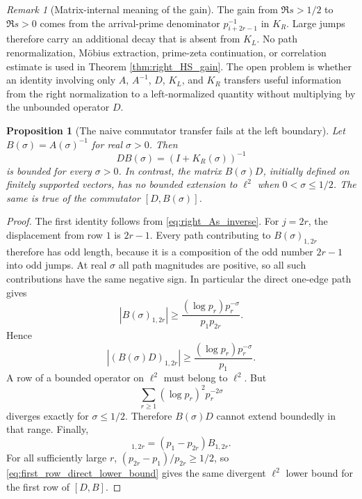 \documentclass[11pt]{amsart}
\numberwithin{equation}{section}
\theoremstyle{plain}
\newtheorem{proposition}[theorem]{Proposition}
\theoremstyle{definition}
\theoremstyle{remark}
\newtheorem{remark}[theorem]{Remark}
\begin{document}
\begin{remark}[Matrix-internal meaning of the gain]
\label{rem:right_gain_meaning}
The gain from $\Re s>1/2$ to $\Re s>0$ comes from the arrival-prime denominator $p_{i+2r-1}^{-1}$ in $K_R$.  Large jumps therefore carry an additional decay that is absent from $K_L$.  No path renormalization, M\"obius extraction, prime-zeta continuation, or correlation estimate is used in Theorem \ref{thm:right_HS_gain}.  The open problem is whether an identity involving only $A$, $A^{-1}$, $D$, $K_L$, and $K_R$ transfers useful information from the right normalization to a left-normalized quantity without multiplying by the unbounded operator $D$.
\end{remark}

\begin{proposition}[The naive commutator transfer fails at the left boundary]
\label{prop:naive_transfer_fails}
Let $B(\sigma)=A(\sigma)^{-1}$ for real $\sigma>0$.  Then
\begin{equation}
D B(\sigma)=(I+K_R(\sigma))^{-1}
\label{eq:DB_right_inverse}
\end{equation}
is bounded for every $\sigma>0$.  In contrast, the matrix $B(\sigma)D$, initially defined on finitely supported vectors, has no bounded extension to $\ell^2$ when $0<\sigma\le1/2$.  The same is true of the commutator $[D,B(\sigma)]$.
\end{proposition}

\begin{proof}
The first identity follows from \eqref{eq:right_As_inverse}.  For $j=2r$, the displacement from row $1$ is $2r-1$.  Every path contributing to $B(\sigma)_{1,2r}$ therefore has odd length, because it is a composition of the odd number $2r-1$ into odd jumps.  At real $\sigma$ all path magnitudes are positive, so all such contributions have the same negative sign.  In particular the direct one-edge path gives
\begin{equation}
|B(\sigma)_{1,2r}|
\ge
\frac{(\log p_r)p_r^{-\sigma}}{p_1p_{2r}}.
\label{eq:first_row_direct_lower_bound}
\end{equation}
Hence
\begin{equation}
|(B(\sigma)D)_{1,2r}|
\ge
\frac{(\log p_r)p_r^{-\sigma}}{p_1}.
\label{eq:BD_first_row_lower_bound}
\end{equation}
A row of a bounded operator on $\ell^2$ must belong to $\ell^2$.  But
\begin{equation}
\sum_{r\ge1}(\log p_r)^2p_r^{-2\sigma}
\label{eq:left_row_divergence}
\end{equation}
diverges exactly for $\sigma\le1/2$.  Therefore $B(\sigma)D$ cannot extend boundedly in that range.  Finally,
\begin{equation}
[D,B]_{1,2r}=(p_1-p_{2r})B_{1,2r}.
\label{eq:commutator_entry}
\end{equation}
For all sufficiently large $r$, $(p_{2r}-p_1)/p_{2r}\ge1/2$, so \eqref{eq:first_row_direct_lower_bound} gives the same divergent $\ell^2$ lower bound for the first row of $[D,B]$.
\end{proof}
\end{document}
